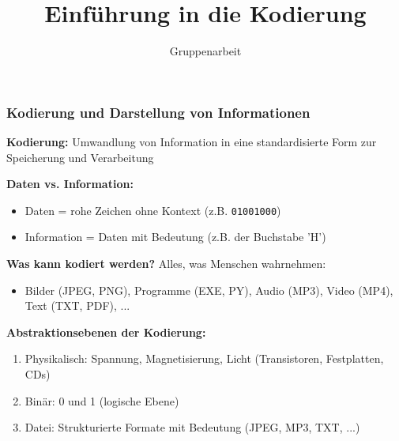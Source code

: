 \documentclass[aspectratio=169]{beamer}
\title{Einführung in die Kodierung}
\subtitle{Gruppenarbeit}
\author{}
\date{\DTMgermanmonthname{\month} \the\year}
\begin{document}
\begin{frame}
\frametitle{Kodierung und Darstellung von Informationen}

\textbf{Kodierung:} Umwandlung von Information in eine standardisierte Form zur Speicherung und Verarbeitung

\textbf{Daten vs. Information:}
\begin{itemize}
    \item Daten = rohe Zeichen ohne Kontext (z.B. \texttt{01001000})
    \item Information = Daten mit Bedeutung (z.B. der Buchstabe 'H')
\end{itemize}

\vspace{0.3cm}

\textbf{Was kann kodiert werden?} Alles, was Menschen wahrnehmen:
\begin{itemize}
    \item Bilder (JPEG, PNG), Programme (EXE, PY), Audio (MP3), Video (MP4), Text (TXT, PDF), ...
\end{itemize}

\vspace{0.3cm}

\textbf{Abstraktionsebenen der Kodierung:}
\begin{enumerate}
    \item Physikalisch: Spannung, Magnetisierung, Licht (Transistoren, Festplatten, CDs)
    \item Binär: 0 und 1 (logische Ebene)
    \item Datei: Strukturierte Formate mit Bedeutung (JPEG, MP3, TXT, ...)
\end{enumerate}

\end{frame}
\end{document}
